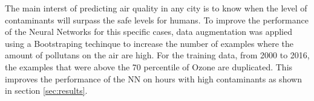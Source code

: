  The main interst of predicting air quality in any city is to know when the level of contaminants
 will surpass the safe levels for humans. To improve the performance of the Neural Networks for 
 this specific cases, data augmentation was applied using a Bootstraping techinque 
 to increase the number of examples where the amount of pollutans
 on the air are high. For the training data, from 2000 to 2016, the examples that were above 
 the 70 percentile of Ozone are duplicated. This improves the performance of the 
 NN on hours with high contaminants as shown in section \ref{sec:results}.


